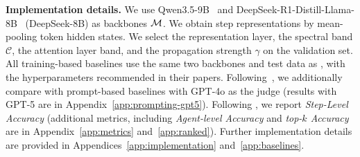 

\textbf{Implementation details.} We use Qwen3.5-9B~\citep{qwen3} and DeepSeek-R1-Distill-Llama-8B~\citep{deepseekr1} (DeepSeek-8B) as backbones $\mathcal{M}$. We obtain step representations by mean-pooling token hidden states. We select the representation layer, the spectral band $\mathcal{C}$, the attention layer band, and the propagation strength $\gamma$ on the validation set.
All training-based baselines use the same two backbones and test data as \soap, with the hyperparameters recommended in their papers. Following~\citet{oat}, we additionally compare with prompt-based baselines with GPT-4o as the judge (results with GPT-5 are in Appendix~\ref{app:prompting-gpt5}). Following \citet{whoandwhen}, we report \emph{Step-Level Accuracy} (additional metrics, including \textit{Agent-level Accuracy} and \textit{top-$k$ Accuracy} are in Appendix~\ref{app:metrics} and~\ref{app:ranked}). Further implementation details are provided in Appendices~\ref{app:implementation} and~\ref{app:baselines}.

